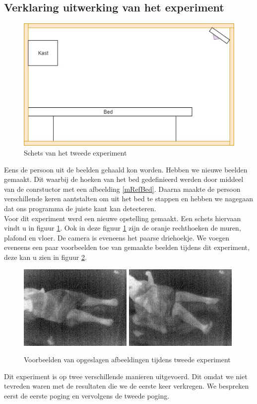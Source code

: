 \subsection{Verklaring uitwerking van het experiment}
\label{ERefDBV}
\begin{figure}[h]
	\includegraphics[scale=0.6]{SchetsExperimentTwee}
	\caption{Schets van het tweede experiment}
	\label{imgTEx}
\end{figure}
Eens de persoon uit de beelden gehaald kon worden. Hebben we nieuwe beelden gemaakt. Dit waarbij de hoeken van het bed gedefinieerd werden door middeel van de conrstuctor met een afbeelding \ref{mRefBed}. Daarna maakte de persoon verschillende keren aantstalten om uit het bed te stappen en hebben we nagegaan dat ons programma de juiste kant kan detecteren. \\
Voor dit experiment werd een nieuwe opstelling gemaakt. Een schets hiervaan vindt u in figuur \ref{imgTEx}.
Ook in deze figuur \ref{imgTEx} zijn de oranje rechthoeken de muren, plafond en vloer. De camera is eveneens het paarse driehoekje. We voegen eveneens een paar voorbeelden toe van gemaakte beelden tijdens dit experiment, deze kan u zien in figuur \ref{imgTEx1}.
\begin{figure}[h]
	\includegraphics[scale=0.85]{TweedeExperiment_img0}
	\includegraphics[scale=0.85]{TweedeExperiment_img4}
	\caption{Voorbeelden van opgeslagen afbeeldingen tijdens tweede experiment}
	\label{imgTEx1}
\end{figure}
Dit experiment is op twee verschillende manieren uitgevoerd. Dit omdat we niet tevreden waren met de resultaten die we de eerste keer verkregen. We bespreken eerst de eerste poging en vervolgens de tweede poging. 

